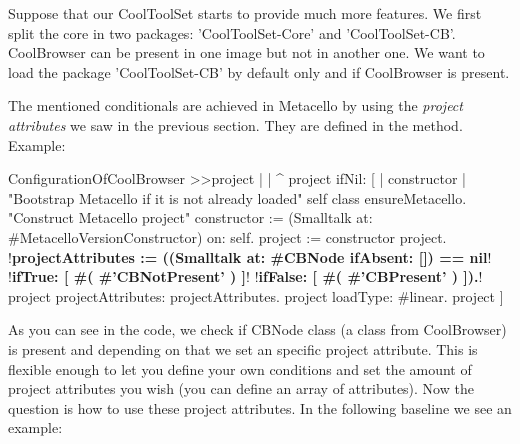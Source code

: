 \documentclass[a4paper,10pt,twoside]{book}
\begin{document}
Suppose that our CoolToolSet starts to provide much more features. We first split the core in two packages: 'CoolToolSet-Core' and 'CoolToolSet-CB'. CoolBrowser can be present in one image but not in another one. We want to load the package 'CoolToolSet-CB' by default only and if CoolBrowser is present.

The mentioned conditionals are achieved in Metacello by using the \emph{project attributes} we saw in the previous section. They are defined in the  method.
Example:


\begin{code}{}
ConfigurationOfCoolBrowser >>project
       |  |
       ^ project ifNil: [ | constructor |
              "Bootstrap Metacello if it is not already loaded"
              self class ensureMetacello.
              "Construct Metacello project"
              constructor := (Smalltalk at: #MetacelloVersionConstructor) on: self.
              project := constructor project.
              !\textbf{projectAttributes :=  ((Smalltalk at: \#CBNode ifAbsent: []) == nil}!
                    !\textbf{ifTrue: [ \#( \#'CBNotPresent' ) ]}!
                    !\textbf{ifFalse: [ \#( \#'CBPresent' ) ]).}!
              project projectAttributes:  projectAttributes.
              project loadType: #linear.
              project ]

\end{code}

As you can see in the code, we check if CBNode class (a class from CoolBrowser) is present and depending on that we set an specific project attribute.
This is flexible enough to let you define your own conditions and set the amount of project attributes you wish (you can define an array of attributes).
Now the question is how to use these project attributes. In the following baseline we see an example:
\end{document}
